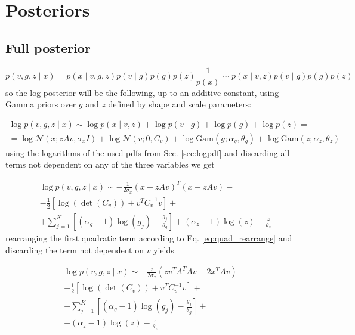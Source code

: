 \documentclass{paper}
\begin{document}
\section{Posteriors}

\subsection{Full posterior} \label{seq:fullpost}

\begin{equation}
p(v,g,z \mid x) = p(x \mid v,g,z) p(v \mid g) p(g) p(z) \frac{1}{p(x)} \sim  p(x \mid v,z) p(v \mid g) p(g) p(z)
\end{equation}
%
so the log-posterior will be the following, up to an additive constant, using Gamma priors over $g$ and $z$ defined by shape and scale parameters:

\begin{equation}
\begin{split}
\log p(v,g,z \mid x) \sim \log p(x \mid v,z) + \log p(v \mid g) + \log p(g) + \log p(z) = \\
= \log \mathcal{N}(x;zAv,\sigma_x I) + \log \mathcal{N}(v;0,C_v) + \log \textrm{Gam}(g;\alpha_g,\theta_g) + \log \textrm{Gam}(z;\alpha_z,\theta_z)
\end{split}
\end{equation}
%
using the logarithms of the used pdfs from Sec. \ref{sec:logpdf} and discarding all terms not dependent on any of the three variables we get

\begin{equation}
\begin{split}
\log p(v,g,z \mid x) \sim -\frac{1}{2 \sigma_x}(x - zAv)^T (x - zAv) - \\
- \frac{1}{2} \left[ \log \left( \det \left( C_v \right) \right) + v^T C_v^{-1} v \right] + \\
+ \sum_{j=1}^K \left[ (\alpha_g - 1) \log(g_j) - \frac{g_j}{\theta_g} \right] + (\alpha_z - 1) \log(z) - \frac{z}{\theta_z}
\end{split}
\end{equation}
%
rearranging the first quadratic term according to Eq. \ref{eq:quad_rearrange} and discarding the term not dependent on $v$ yields

\begin{equation}
\begin{split}
\log p(v,g,z \mid x) \sim - \frac{z}{2 \sigma_x} \left( zv^TA^TAv - 2x^TAv \right)- \\
- \frac{1}{2} \left[ \log \left( \det \left( C_v \right) \right) + v^T C_v^{-1} v \right] + \\
+ \sum_{j=1}^K \left[ (\alpha_g - 1) \log(g_j) - \frac{g_j}{\theta_g} \right] + \\
+ (\alpha_z - 1) \log(z) - \frac{z}{\theta_z}
\end{split}
\end{equation}
\end{document}
